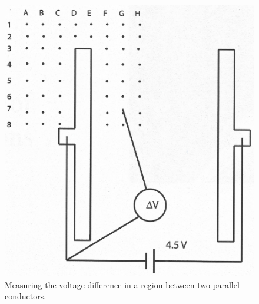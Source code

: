 \documentclass[letterpaper]{article}
\begin{document}
\begin{figure}[H]
  \centering
  \includegraphics[width=.7\textwidth]{fig3.jpg}
  \caption{Measuring the voltage difference in a region between two parallel conductors. \cite{labmanual}}
\end{figure}

%
%
\end{document}
